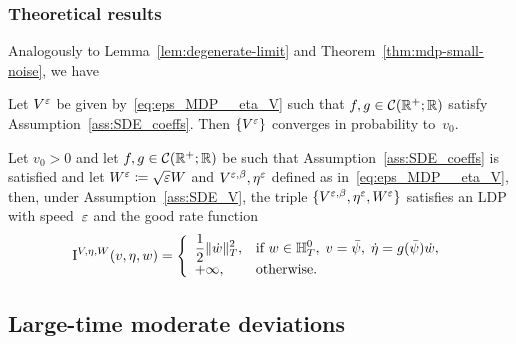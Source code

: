 \subsubsection{Theoretical results}

Analogously to Lemma~\ref{lem:degenerate-limit} and Theorem~\ref{thm:mdp-small-noise}, we have 
\begin{lemma} \label{lem:degenerate-limit-small}
Let $V^{\varepsilon}$ be given by~\eqref{eq:eps_MDP__eta_V}
such that $f,g\in\mathcal{C}(\mathbb{R}^+;  \mathbb{R})$ satisfy Assumption~\ref{ass:SDE_coeffs}. 
Then $\{V^{\varepsilon}\}$ converges in probability to~$v_0$.
\end{lemma}



\begin{theorem}\label{mdp-small-time}
Let $v_0>0$ and let $f, g \in \mathcal{C}(\mathbb{R}^+;  \mathbb{R})$ be such that Assumption~\ref{ass:SDE_coeffs} is satisfied and let $W^{\varepsilon} \coloneqq \sqrt{\varepsilon}W$ and $V^{\varepsilon,\beta}, \eta^{\varepsilon}$ defined as in~\eqref{eq:eps_MDP__eta_V}, then, under Assumption~\ref{ass:SDE_V}, the triple
$\{V^{\varepsilon,\beta}, \eta^\varepsilon,W^\varepsilon\}$ satisfies an LDP with speed~$\varepsilon$ and the good rate function
\begin{equation*}
\mathrm{I}^{V,\eta,W}(v,\eta,w) = 
\left\{
\begin{array}{ll}
\displaystyle \frac{1}{2}\|\dot{w}\|_{T}^2, & \text{if }
\displaystyle 
w \in \mathbb{H}_T^0,\;
v = \bar\psi,\;
\dot{\eta} =  g(\bar\psi)\dot{w},\\
+\infty, & \text{otherwise}.
\end{array}
\right.
\end{equation*}
\end{theorem}


\subsection{Large-time moderate deviations} \label{sec:largetimeMDP}

